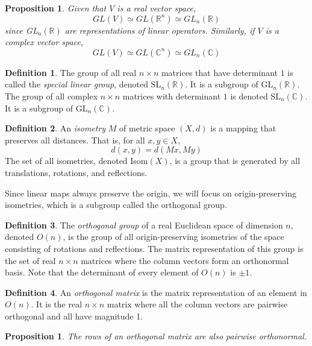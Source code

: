 \documentclass{article}
\newtheorem{proposition}[theorem]{Proposition}
\theoremstyle{remark}
\theoremstyle{definition}
\newtheorem{definition}{Definition}[section]
\begin{document}
\begin{proposition}
Given that $V$ is a real vector space, 
\[GL(V) \simeq GL(\mathbb{R}^n) \simeq GL_n (\mathbb{R})\]
since GL$_n(\mathbb{R})$ are representations of linear operators. Similarly, if $V$ is a complex vector space, 
\[GL(V) \simeq GL(\mathbb{C}^n) \simeq GL_n (\mathbb{C})\]
\end{proposition}

\begin{definition}
The group of all real $n \times n$ matrices that have determinant $1$ is called the \textit{special linear group}, denoted SL$_n (\mathbb{R})$. It is a subgroup of GL$_n (\mathbb{R})$. The group of all complex $n \times n$ matrices with determinant $1$ is denoted SL$_n (\mathbb{C})$. It is a subgroup of GL$_n(\mathbb{C})$. 
\end{definition}

\begin{definition}
An \textit{isometry} $M$ of metric space $(X, d)$ is a mapping that preserves all distances. That is, for all $x, y \in X$, 
\[d(x, y) = d(M x, M y) \]
The set of all isometries, denoted Isom$(X)$, is a group that is generated by all translations, rotations, and reflections. 
\end{definition}

Since linear maps always preserve the origin, we will focus on origin-preserving isometries, which is a subgroup called the orthogonal group.

\begin{definition}
The \textit{orthogonal group} of a real Euclidean space of dimension $n$, denoted $O(n)$, is the group of all origin-preserving isometries of the space consisting of rotations and reflections. The matrix representation of this group is the set of real $n \times n$ matrices where the column vectors form an orthonormal basis. Note that the determinant of every element of $O(n)$ is $\pm 1$. 
\end{definition}

\begin{definition}
An \textit{orthogonal matrix} is the matrix representation of an element in $O(n)$. It is the real $n \times n$ matrix where all the column vectors are pairwise orthogonal and all have magnitude 1. 
\end{definition}

\begin{proposition}
The rows of an orthogonal matrix are also pairwise orthonormal.
\end{proposition}
\end{document}
